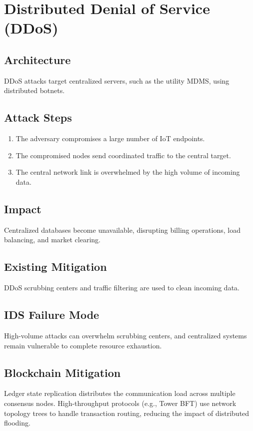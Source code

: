 \documentclass[12pt, oneside, a4paper]{report}
\theoremstyle{definition}
\theoremstyle{remark}
\begin{document}
\bigskip

\section{Distributed Denial of Service (DDoS)}
\label{sec:tm:ddos}

\subsection{Architecture}
DDoS attacks target centralized servers, such as the utility MDMS, using distributed botnets.

\subsection{Attack Steps}
\begin{enumerate}
  \item The adversary compromises a large number of IoT endpoints.
  \item The compromised nodes send coordinated traffic to the central target.
  \item The central network link is overwhelmed by the high volume of incoming data.
\end{enumerate}

\subsection{Impact}
Centralized databases become unavailable, disrupting billing operations, load balancing, and market clearing.

\subsection{Existing Mitigation}
DDoS scrubbing centers and traffic filtering are used to clean incoming data.

\subsection{IDS Failure Mode}
High-volume attacks can overwhelm scrubbing centers, and centralized systems remain vulnerable to complete resource exhaustion.

\subsection{Blockchain Mitigation}
Ledger state replication distributes the communication load across multiple consensus nodes. High-throughput protocols (e.g., Tower BFT) use network topology trees to handle transaction routing, reducing the impact of distributed flooding.
\end{document}
